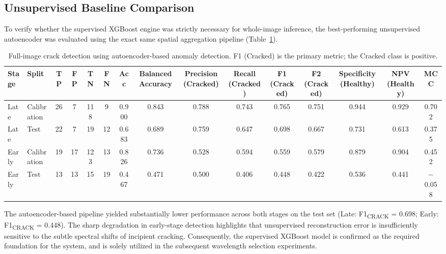 \begin{landscape}
\thispagestyle{plain}
\FloatBarrier

\subsection{Unsupervised Baseline Comparison}

\noindent
To verify whether the supervised XGBoost engine was strictly necessary for whole-image inference, the best-performing unsupervised autoencoder was evaluated using the exact same spatial aggregation pipeline (Table~\ref{tab:full_image_autoencoder_metrics}).

\begin{table}[!h]
\centering
\caption[Full-image autoencoder-based crack detection]{Full-image crack detection using autoencoder-based anomaly detection. F1 (Cracked) is the primary metric; the Cracked class is positive.}
\label{tab:full_image_autoencoder_metrics}

\small
\renewcommand{\arraystretch}{1.25}
\setlength{\tabcolsep}{6pt}

\begin{adjustbox}{max width=\linewidth,center}
\begin{tabular}{@{}llccccccccccccc@{}}

\toprule
Stage &
Split &
TP &
FP &
TN &
FN &
Acc &
Balanced Accuracy &
Precision (Cracked) &
Recall (Cracked) &
F1 (Cracked) &
F2 (Cracked) &
Specificity (Healthy) &
NPV (Healthy) &
MCC \\
\midrule

Late & Calibration &
26 & 7 & 118 & 9 &
0.900 & 0.843 & 0.788 & 0.743 & 0.765 & 0.751 & 0.944 & 0.929 & 0.702 \\

Late & Test &
22 & 7 & 19 & 12 &
0.683 & 0.689 & 0.759 & 0.647 & 0.698 & 0.667 & 0.731 & 0.613 & 0.375 \\

\addlinespace[4pt]

Early & Calibration &
19 & 17 & 123 & 13 &
0.826 & 0.736 & 0.528 & 0.594 & 0.559 & 0.579 & 0.879 & 0.904 & 0.452 \\

Early & Test &
13 & 13 & 15 & 19 &
0.467 & 0.471 & 0.500 & 0.406 & 0.448 & 0.422 & 0.536 & 0.441 & $-$0.058 \\

\bottomrule
\end{tabular}
\end{adjustbox}
\end{table}

\noindent
The autoencoder-based pipeline yielded substantially lower performance across both stages on the test set (Late: F1\textsubscript{CRACK} = 0.698; Early: F1\textsubscript{CRACK} = 0.448). The sharp degradation in early-stage detection highlights that unsupervised reconstruction error is insufficiently sensitive to the subtle spectral shifts of incipient cracking. Consequently, the supervised XGBoost model is confirmed as the required foundation for the system, and is solely utilized in the subsequent wavelength selection experiments.

\FloatBarrier
\end{landscape}
